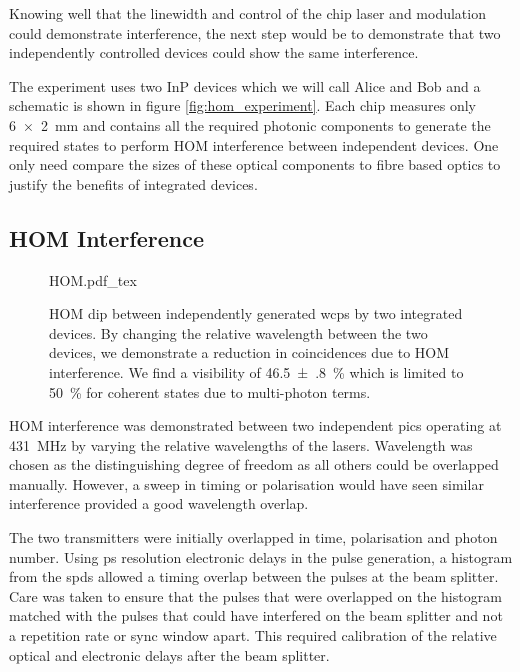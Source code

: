 Knowing well that the linewidth and control of the chip laser and modulation could demonstrate interference, the next step would be to demonstrate that two independently controlled devices could show the same interference. 

The experiment uses two \ac{InP} devices which we will call Alice and Bob and a schematic is shown in figure \ref{fig:hom_experiment}. Each chip measures only \SI{6x2}{mm} and contains all the required photonic components to generate the required states to perform \ac{HOM} interference between independent devices. One only need compare the sizes of these optical components to fibre based optics to justify the benefits of integrated devices.



\subsection{HOM Interference}

\begin{figure}[tp]
	\centering
	\def\svgwidth{0.8\textwidth} 
	{HOM.pdf_tex}
	\caption[Hong-Ou-Mandel interference between integrated devices]{\ac{HOM} dip between independently generated \acp{wcp} by two integrated devices. By changing the relative wavelength between the two devices, we demonstrate a reduction in coincidences due to \ac{HOM} interference. We find a visibility of \SI{46.5(8)}{\%} which is limited to \SI{50}{\percent} for coherent states due to multi-photon terms.}
	\label{fig:HOM}
\end{figure}

\acl{HOM} interference was demonstrated between two independent \acp{pic} operating at \SI{431}{\MHz} by varying the relative wavelengths of the lasers. Wavelength was chosen as the distinguishing degree of freedom as all others could be overlapped manually. However, a sweep in timing or polarisation would have seen similar interference provided a good wavelength overlap. 

The two transmitters were initially overlapped in time, polarisation and photon number. Using ps resolution electronic delays in the pulse generation, a histogram from the \acp{spd} allowed a timing overlap between the pulses at the beam splitter. Care was taken to ensure that the pulses that were overlapped on the histogram matched with the pulses that could have interfered on the beam splitter and not a repetition rate or sync window apart. This required calibration of the relative optical and electronic delays after the beam splitter. 

